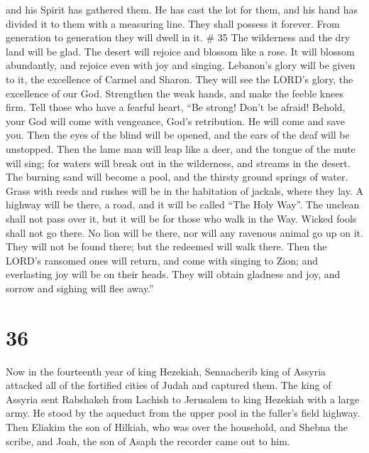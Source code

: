 and his Spirit has gathered them.  He has cast the lot for
them, and his hand has divided it to them with a measuring line. They
shall possess it forever. From generation to generation they will dwell
in it. \# 35  The wilderness and the dry land will be glad.
The desert will rejoice and blossom like a rose.  It will
blossom abundantly, and rejoice even with joy and singing. Lebanon's
glory will be given to it, the excellence of Carmel and Sharon. They
will see the LORD's glory, the excellence of our God. 
Strengthen the weak hands, and make the feeble knees firm. 
Tell those who have a fearful heart, ``Be strong! Don't be afraid!
Behold, your God will come with vengeance, God's retribution. He will
come and save you.  Then the eyes of the blind will be
opened, and the ears of the deaf will be unstopped.  Then
the lame man will leap like a deer, and the tongue of the mute will
sing; for waters will break out in the wilderness, and streams in the
desert.  The burning sand will become a pool, and the
thirsty ground springs of water. Grass with reeds and rushes will be in
the habitation of jackals, where they lay.  A highway will
be there, a road, and it will be called ``The Holy Way''. The unclean
shall not pass over it, but it will be for those who walk in the Way.
Wicked fools shall not go there.  No lion will be there, nor
will any ravenous animal go up on it. They will not be found there; but
the redeemed will walk there.  Then the LORD's ransomed
ones will return, and come with singing to Zion; and everlasting joy
will be on their heads. They will obtain gladness and joy, and sorrow
and sighing will flee away.''

\hypertarget{section-34}{%
\section{36}\label{section-34}}

 Now in the fourteenth year of king Hezekiah, Sennacherib
king of Assyria attacked all of the fortified cities of Judah and
captured them.  The king of Assyria sent Rabshakeh from
Lachish to Jerusalem to king Hezekiah with a large army. He stood by the
aqueduct from the upper pool in the fuller's field highway. 
Then Eliakim the son of Hilkiah, who was over the household, and Shebna
the scribe, and Joah, the son of Asaph the recorder came out to him.

